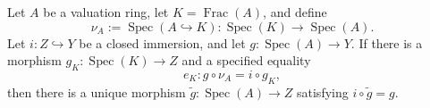 \begin{lemma}
  \label{lemma:nagata-valuation-factor-closed}
  \lean{}

  Let $A$ be a valuation ring, let $K=\operatorname{Frac}(A)$, and define
  \[
    \nu_A:=\operatorname{Spec}(A\hookrightarrow K)
      \colon\operatorname{Spec}(K)\to\operatorname{Spec}(A).
  \]
  Let $i\colon Z\hookrightarrow Y$ be a closed
  immersion, and let $g\colon\operatorname{Spec}(A)\to Y$.  If there is a
  morphism $g_K\colon\operatorname{Spec}(K)\to Z$ and a specified equality
  \[
    e_K\colon g\circ\nu_A=i\circ g_K,
  \]
  then there is a unique morphism
  $\widetilde g\colon\operatorname{Spec}(A)\to Z$ satisfying
  $i\circ\widetilde g=g$.
\end{lemma}

